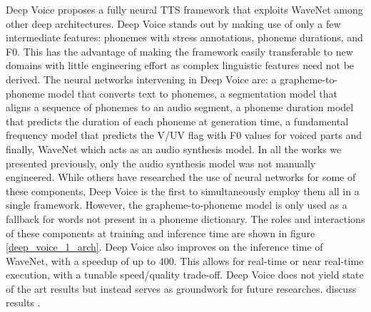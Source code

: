 \documentclass[a4paper, oneside]{article}
\begin{document}


Deep Voice \citep{DeepVoice1} proposes a fully neural TTS framework that exploits WaveNet among other deep architectures. Deep Voice stands out by making use of only a few intermediate features: phonemes with stress annotations, phoneme durations,
and F0. This has the advantage of making the framework easily transferable to new domains with little engineering effort as complex linguistic features need not be derived. The neural networks intervening in Deep Voice are: a grapheme-to-phoneme model that converts text to phonemes, a segmentation model that aligns a sequence of phonemes to an audio segment, a phoneme duration model that predicts the duration of each phoneme at generation time, a fundamental frequency model that predicts the V/UV flag with F0 values for voiced parts and finally, WaveNet which acts as an audio synthesis model. In all the works we presented previously, only the audio synthesis model was not manually engineered. While others have researched the use of neural networks for some of these components, Deep Voice is the first to simultaneously employ them all in a single framework. However, the grapheme-to-phoneme model is only used as a fallback for words not present in a phoneme dictionary. The roles and interactions of these components at training and inference time are shown in figure \ref{deep_voice_1_arch}. Deep Voice also improves on the inference time of WaveNet, with a speedup of up to 400. This allows for real-time or near real-time execution, with a tunable speed/quality trade-off. Deep Voice does not yield state of the art results but instead serves as groundwork for future researches. \color{red} discuss results \color{black}.
\end{document}
